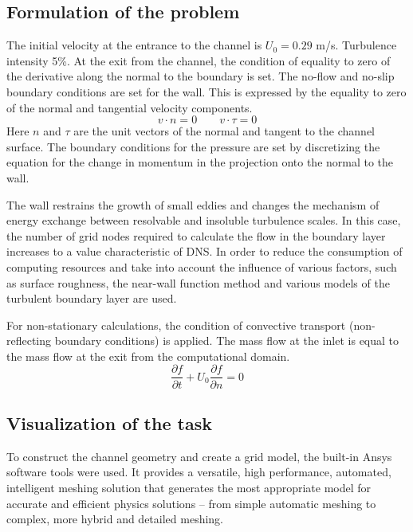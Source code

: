 \subsection{Formulation of the problem}
	The initial velocity at the entrance to the channel is $U_0 = 0.29$ m/s. Turbulence intensity 5\%. At the exit from the channel, the condition of equality to zero of the derivative along the normal to the boundary is set. The no-flow and no-slip boundary conditions are set for the wall. This is expressed by the equality to zero of the normal and tangential velocity components.
	\begin{equation}
		v \cdot n = 0 \qquad v \cdot \tau = 0
	\end{equation}
	Here $n$ and $\tau$ are the unit vectors of the normal and tangent to the channel surface. The boundary conditions for the pressure are set by discretizing the equation for the change in momentum in the projection onto the normal to the wall.
	
	The wall restrains the growth of small eddies and changes the mechanism of energy exchange between resolvable and insoluble turbulence scales. In this case, the number of grid nodes required to calculate the flow in the boundary layer increases to a value characteristic of DNS. In order to reduce the consumption of computing resources and take into account the influence of various factors, such as surface roughness, the near-wall function method and various models of the turbulent boundary layer are used\cite{Cabot2000}.
	
	For non-stationary calculations, the condition of convective transport (non-reflecting boundary conditions) is applied. The mass flow at the inlet is equal to the mass flow at the exit from the computational domain.
	\begin{equation}
		\frac{\partial f}{\partial t} + U_0\frac{\partial f}{\partial n} = 0
	\end{equation}

\subsection{Visualization of the task}
	To construct the channel geometry and create a grid model, the built-in Ansys software tools were used. It provides a versatile, high performance, automated, intelligent meshing solution that generates the most appropriate model for accurate and efficient physics solutions -- from simple automatic meshing to complex, more hybrid and detailed meshing.
